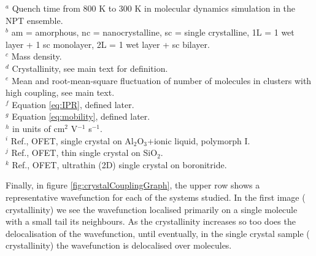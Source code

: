 $^a$ Quench time from 800 K to 300 K in molecular dynamics simulation in the NPT ensemble. \\
$^b$ am = amorphous, nc = nanocrystalline, sc = single crystalline, 1L = 1 wet layer + 1 sc monolayer, 2L = 1 wet layer + sc bilayer. \\
$^c$ Mass density. \\
$^d$ Crystallinity, see main text for definition. \\
$^e$ Mean and root-mean-square fluctuation of number of molecules in clusters with high coupling, see main text. \\
$^f$ Equation \eqref{eq:IPR}, defined later.  \\
$^g$ Equation \eqref{eq:mobility}, defined later. \\
$^h$ in units of cm$^2$ V$^{-1}$ s$^{-1}$. \\
$^i$ Ref.\cite{Takeyama2012_PentCryst}, OFET, single crystal on Al$_2$O$_3$+ionic liquid, polymorph I. \\
$^j$ Ref.\cite{Arabi2016}, OFET, thin single crystal on SiO$_2$. \\
$^k$ Ref.\cite{Zhang2016TF}, OFET, ultrathin (2D) single crystal on boronitride.

Finally, in figure \ref{fig:crystalCouplingGraph}, the upper row shows a representative wavefunction for each of the systems studied. In the first image ( crystallinity) we see the wavefunction localised primarily on a single molecule with a small tail its neighbours. As the crystallinity increases so too does the delocalisation of the wavefunction, until eventually, in the single crystal sample ( crystallinity) the wavefunction is delocalised over  molecules.

